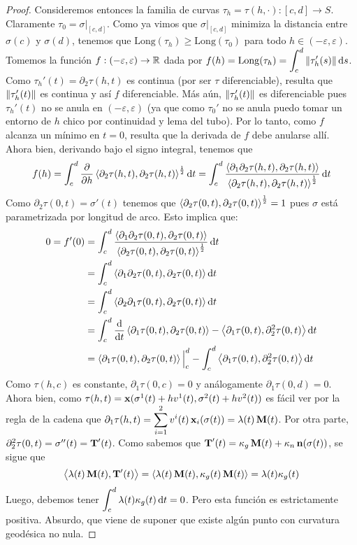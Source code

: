 \begin{prop}
\begin{proof}
Consideremos entonces la familia de curvas $\tau_h=\tau(h,\cdot):[c,d]\to S$. Claramente $\tau_0=\left.\sigma\right|_{[c,d]}$. Como ya vimos que $\left.\sigma\right|_{[c,d]}$ minimiza la distancia entre $\sigma(c)$ y $\sigma(d)$, tenemos que $\mathrm{Long}(\tau_h)\geq\mathrm{Long}(\tau_0)$ para todo $h\in(-\varepsilon,\varepsilon)$. Tomemos la función $f:(-\varepsilon,\varepsilon)\to\mathbb{R}$ dada por $f(h)=\mathrm{Long}(\tau_h)=\displaystyle\int_c^d \left\| \tau_h'(s) \right\|\mathop{}\!\mathrm{d} s$. Como $\tau_h'(t) = \partial_2 \tau(h,t)$ es continua (por ser $\tau$ diferenciable), resulta que $\left\| \tau_h'(t) \right\|$ es continua y así $f$ diferenciable. Más aún, $\left\| \tau_h'(t) \right\|$ es diferenciable pues $\tau_h'(t)$ no se anula en $(-\varepsilon,\varepsilon)$ (ya que como $\tau_0'$ no se anula puedo tomar un entorno de $h$ chico por continuidad y lema del tubo). Por lo tanto, como $f$ alcanza un mínimo en $t=0$, resulta que la derivada de $f$ debe anularse allí. Ahora bien, derivando bajo el signo integral, tenemos que $$f(h)=\displaystyle\int_c^d \dfrac{\partial}{\partial h}\left\langle \partial_2\tau(h,t),\partial_2\tau(h,t) \right\rangle^{\frac{1}{2}}\mathop{}\!\mathrm{d} t = \displaystyle\int_c^d \dfrac{\left\langle \partial_1\partial_2\tau(h,t),\partial_2\tau(h,t) \right\rangle}{\left\langle \partial_2\tau(h,t),\partial_2\tau(h,t) \right\rangle^{\frac{1}{2}}}\mathop{}\!\mathrm{d} t$$ Como $\partial_2\tau(0,t)=\sigma'(t)$ tenemos que $\left\langle \partial_2\tau(0,t),\partial_2\tau(0,t) \right\rangle^{\frac{1}{2}}=1$ pues $\sigma$ está parametrizada por longitud de arco. Esto implica que: \begin{align*}0 = f'(0) &= \displaystyle\int_c^d \dfrac{\left\langle \partial_1\partial_2\tau(0,t),\partial_2\tau(0,t) \right\rangle}{\left\langle \partial_2\tau(0,t),\partial_2\tau(0,t) \right\rangle^{\frac{1}{2}}}\mathop{}\!\mathrm{d} t \\ &= \displaystyle\int_c^d\left\langle \partial_1\partial_2\tau(0,t),\partial_2\tau(0,t) \right\rangle\mathop{}\!\mathrm{d} t \\ &= \displaystyle\int_c^d \left\langle \partial_2\partial_1\tau(0,t),\partial_2\tau(0,t) \right\rangle\mathop{}\!\mathrm{d} t \\ &=\displaystyle\int_c^d \dfrac{\mathop{}\!\mathrm{d}}{\mathop{}\!\mathrm{d} t}\left\langle \partial_1\tau(0,t),\partial_2\tau(0,t) \right\rangle - \left\langle \partial_1\tau(0,t),\partial_2^2\tau(0,t) \right\rangle\mathop{}\!\mathrm{d} t\\&= \left\langle \partial_1\tau(0,t),\partial_2\tau(0,t) \right\rangle\Big\rvert_{c}^{d} - \displaystyle\int_c^d \left\langle \partial_1\tau(0,t),\partial_2^2\tau(0,t) \right\rangle\mathop{}\!\mathrm{d} t \end{align*} Como $\tau(h,c)$ es constante, $\partial_1\tau(0,c)=0$ y análogamente $\partial_1\tau(0,d)=0$. Ahora bien, como $\tau(h,t)=\operatorname{\mathbf{x}}(\sigma^1(t)+hv^1(t),\sigma^2(t)+hv^2(t))$ es fácil ver por la regla de la cadena que $\partial_1\tau(h,t)=\displaystyle\sum_{i=1}^2 v^i(t)\operatorname{\mathbf{x}}_i(\sigma(t)) = \lambda(t)\operatorname{\mathbf{M}}(t)$. Por otra parte, $\partial_2^2\tau(0,t)=\sigma''(t)=\operatorname{\mathbf{T}}'(t)$. Como sabemos que $\operatorname{\mathbf{T}}'(t)=\kappa_g\operatorname{\mathbf{M}}(t)+\kappa_n\operatorname{\mathbf{n}}(\sigma(t))$, se sigue que $$\left\langle \lambda(t)\operatorname{\mathbf{M}}(t),\operatorname{\mathbf{T}}'(t) \right\rangle = \left\langle \lambda(t)\operatorname{\mathbf{M}}(t),\kappa_g(t)\operatorname{\mathbf{M}}(t) \right\rangle = \lambda(t)\kappa_g(t)$$ Luego, debemos tener $\displaystyle\int_c^d \lambda(t)\kappa_g(t)\mathop{}\!\mathrm{d} t = 0$. Pero esta función es estrictamente positiva. Absurdo, que viene de suponer que existe algún punto con curvatura geodésica no nula.
\end{proof}
\end{prop}

